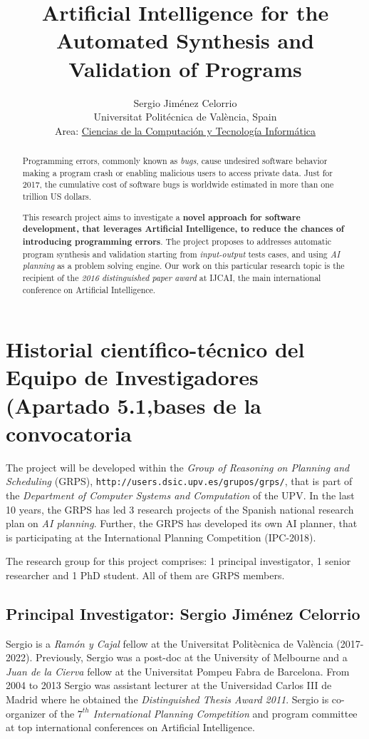 \documentclass[10pt,a4paper]{paper}
\title{Artificial Intelligence for the Automated Synthesis and Validation of Programs}
\author{Sergio Jim\'enez Celorrio\\
\footnotesize Universitat Politécnica de València, Spain\\
\small Area: \underline{Ciencias de la Computación y Tecnología Informática}}
\begin{document}
\maketitle

\begin{abstract}
Programming errors, commonly known as {\em bugs}, cause undesired software behavior making a program crash or enabling malicious users to access private data. Just for 2017, the cumulative cost of software bugs is worldwide estimated in more than one trillion US dollars. 

This research project aims to investigate a {\bf novel approach for software development, that leverages Artificial Intelligence, to reduce the chances of introducing programming errors}. The project proposes to addresses automatic program synthesis and validation starting from {\em input-output} tests cases, and using {\em AI planning} as a problem solving engine. Our work on this particular research topic is the recipient of the {\em 2016 distinguished paper award} at {\sc IJCAI}, the main international conference on Artificial Intelligence.
\end{abstract}

\section{Historial científico-técnico del Equipo de Investigadores (Apartado 5.1,bases de la convocatoria}

The project will be developed within the {\em Group of Reasoning on Planning and Scheduling} (GRPS), {\tt http://users.dsic.upv.es/grupos/grps/}, that is part of the {\em Department of Computer Systems and Computation} of the UPV. In the last 10 years, the GRPS has led 3 research projects of the Spanish national research plan on {\em AI planning}. Further, the GRPS has developed its own AI planner, that is participating  at the International Planning Competition (IPC-2018).

The research group for this project comprises: 1 principal investigator, 1 senior researcher and 1 PhD student. All of them are GRPS members. 

\subsection{Principal Investigator: Sergio Jiménez Celorrio}
Sergio is a {\em Ramón y Cajal} fellow at the Universitat Politècnica de València (2017-2022). Previously, Sergio was a post-doc at the University of Melbourne and a {\em Juan de la Cierva} fellow at the Universitat Pompeu Fabra de Barcelona. From 2004 to 2013 Sergio was assistant lecturer at the Universidad Carlos III de Madrid where he obtained the {\em Distinguished Thesis Award 2011}. Sergio is co-organizer of the {\em $7^{th}$ International Planning Competition} and program committee at top international conferences on Artificial Intelligence.
\end{document}

